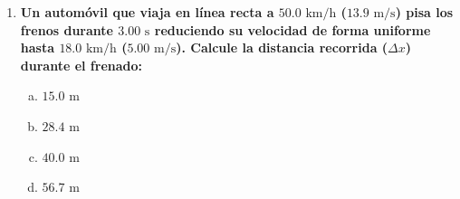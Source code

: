 \documentclass[11pt,a4paper]{article}
\begin{document}
\begin{enumerate}
    \item \textbf{Un automóvil que viaja en línea recta a $50.0 \text{ km/h}$ ($13.9 \text{ m/s}$) pisa los frenos durante $3.00 \text{ s}$ reduciendo su velocidad de forma uniforme hasta $18.0 \text{ km/h}$ ($5.00 \text{ m/s}$). Calcule la distancia recorrida ($\Delta x$) durante el frenado:}
    \begin{enumerate}[a)]
        \item $15.0 \text{ m}$
        \item $28.4 \text{ m}$
        \item $40.0 \text{ m}$
        \item $56.7 \text{ m}$
    \end{enumerate}

\end{enumerate}
\end{document}
